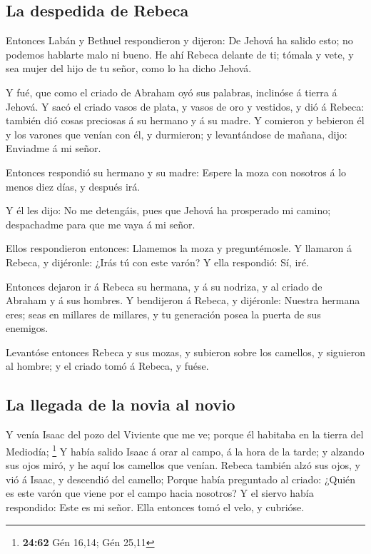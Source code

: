 \hypertarget{la-despedida-de-rebeca}{%
\subsection{La despedida de Rebeca}\label{la-despedida-de-rebeca}}

 Entonces Labán y Bethuel respondieron y dijeron: De
Jehová ha salido esto; no podemos hablarte malo ni bueno.
 He ahí Rebeca delante de ti; tómala y vete, y sea mujer
del hijo de tu señor, como lo ha dicho Jehová.

 Y fué, que como el criado de Abraham oyó sus palabras,
inclinóse á tierra á Jehová.  Y sacó el criado vasos de
plata, y vasos de oro y vestidos, y dió á Rebeca: también dió cosas
preciosas á su hermano y á su madre.  Y comieron y
bebieron él y los varones que venían con él, y durmieron; y levantándose
de mañana, dijo: Enviadme á mi señor.

 Entonces respondió su hermano y su madre: Espere la moza
con nosotros á lo menos diez días, y después irá.

 Y él les dijo: No me detengáis, pues que Jehová ha
prosperado mi camino; despachadme para que me vaya á mi señor.

 Ellos respondieron entonces: Llamemos la moza y
preguntémosle.  Y llamaron á Rebeca, y dijéronle: ¿Irás
tú con este varón? Y ella respondió: Sí, iré.

 Entonces dejaron ir á Rebeca su hermana, y á su nodriza,
y al criado de Abraham y á sus hombres.  Y bendijeron á
Rebeca, y dijéronle: Nuestra hermana eres; seas en millares de millares,
y tu generación posea la puerta de sus enemigos.

 Levantóse entonces Rebeca y sus mozas, y subieron sobre
los camellos, y siguieron al hombre; y el criado tomó á Rebeca, y fuése.

\hypertarget{la-llegada-de-la-novia-al-novio}{%
\subsection{La llegada de la novia al
novio}\label{la-llegada-de-la-novia-al-novio}}

 Y venía Isaac del pozo del Viviente que me ve; porque él
habitaba en la tierra del Mediodía; \footnote{\textbf{24:62} Gén 16,14;
  Gén 25,11}  Y había salido Isaac á orar al campo, á la
hora de la tarde; y alzando sus ojos miró, y he aquí los camellos que
venían.  Rebeca también alzó sus ojos, y vió á Isaac, y
descendió del camello;  Porque había preguntado al
criado: ¿Quién es este varón que viene por el campo hacia nosotros? Y el
siervo había respondido: Este es mi señor. Ella entonces tomó el velo, y
cubrióse.

